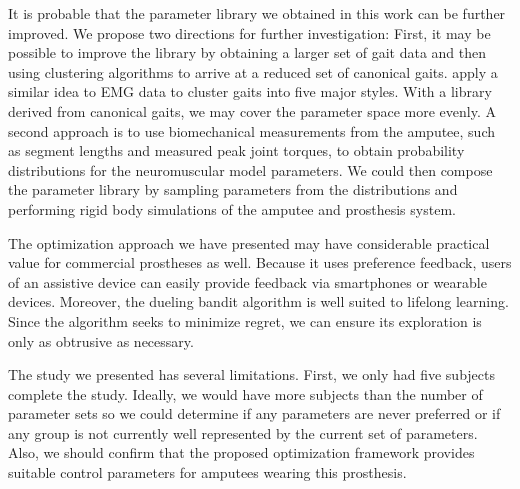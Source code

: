 It is probable that the parameter library we obtained in this work can be
further improved. We propose two directions for further investigation: First, it
may be possible to improve the library by obtaining a larger set of gait data
and then using clustering algorithms to arrive at a reduced set of canonical
gaits. \citet{vardaxis1998classification} apply a similar idea to EMG data to
cluster gaits into five major styles. With a library derived from canonical
gaits, we may cover the parameter space more evenly. A second approach is to use
biomechanical measurements from the amputee, such as segment lengths and
measured peak joint torques, to obtain probability distributions for the
neuromuscular model parameters. We could then compose the parameter library by
sampling parameters from the distributions and performing rigid body simulations
of the amputee and prosthesis system.

The optimization approach we have presented may have considerable practical
value for commercial prostheses as well. Because it uses preference feedback,
users of an assistive device can easily provide feedback via smartphones or
wearable devices. Moreover, the dueling bandit algorithm is well suited to
lifelong learning. Since the algorithm seeks to minimize regret, we can ensure
its exploration is only as obtrusive as necessary. 

The study we presented has several limitations. First, we only had five subjects
complete the study. Ideally, we would have more subjects than the number of
parameter sets so we could determine if any parameters are never preferred or if
any group is not currently well represented by the current set of parameters.
Also, we should confirm that the proposed optimization framework provides
suitable control parameters for amputees wearing this prosthesis.
